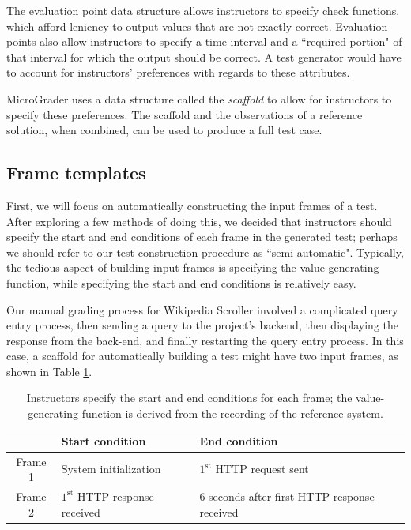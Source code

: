 \documentclass[12pt]{article}
\begin{document}
The evaluation point data structure allows instructors to specify check functions, which afford leniency to output values that are not exactly correct.  Evaluation points also allow instructors to specify a time interval and a ``required portion" of that interval for which the output should be correct.  A test generator would have to account for instructors' preferences with regards to these attributes.

MicroGrader uses a data structure called the \textit{scaffold} to allow for instructors to specify these preferences.  The scaffold and the observations of a reference solution, when combined, can be used to produce a full test case.

\subsection{Frame templates}
First, we will focus on automatically constructing the input frames of a test.  After exploring a few methods of doing this, we decided that instructors should specify the start and end conditions of each frame in the generated test; perhaps we should refer to our test construction procedure as ``semi-automatic".  Typically, the tedious aspect of building input frames is specifying the value-generating function, while specifying the start and end conditions is relatively easy.

Our manual grading process for Wikipedia Scroller involved a complicated query entry process, then sending a query to the project's backend, then displaying the response from the back-end, and finally restarting the query entry process.  In this case, a scaffold for automatically building a test might have two input frames, as shown in Table \ref{table:frame-templates}.

\begin{table}[ht]
\begin{center}
\begin{tabular}{c|ll}
& Start condition & End condition \\ \hline
Frame 1 & System initialization & $1^{\text{st}}$ HTTP request sent \\
Frame 2 & $1^{\text{st}}$ HTTP response received & 6 seconds after first HTTP response received \\ \hline
\end{tabular}
\caption{Instructors specify the start and end conditions for each frame; the value-generating function is derived from the recording of the reference system.}
\label{table:frame-templates}
\end{center}
\end{table}
\end{document}
